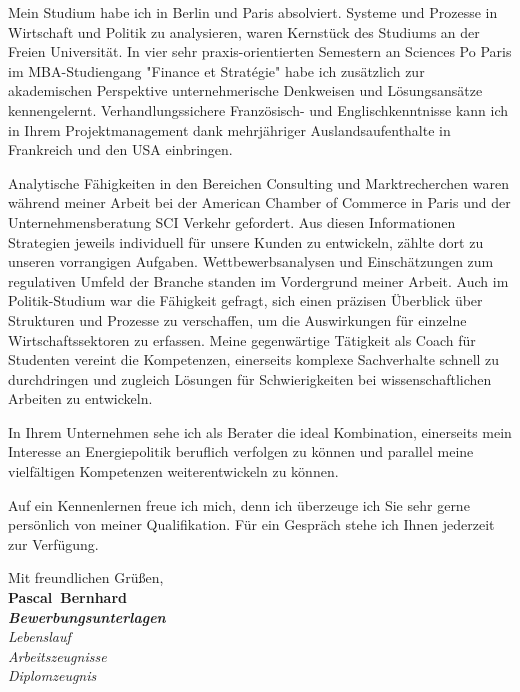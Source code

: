 \documentclass[11pt,a4paper]{article}
\def\firstname{Pascal}
\def\familyname{Bernhard}
\begin{document}
Mein Studium habe ich in Berlin und Paris absolviert. Systeme und Prozesse in Wirtschaft und Politik zu analysieren, waren Kernstück des Studiums an der Freien Universität. In vier sehr praxis-orientierten Semestern an Sciences Po Paris im MBA-Studiengang "Finance et Stratégie" habe ich zusätzlich zur akademischen Perspektive unternehmerische Denkweisen und Lösungsansätze kennengelernt. Verhandlungssichere Französisch- und Englischkenntnisse kann ich in Ihrem Projektmanagement dank mehrjähriger Auslandsaufenthalte in Frankreich und den USA einbringen.


Analytische Fähigkeiten in den Bereichen Consulting und Marktrecherchen waren während meiner Arbeit bei der American Chamber of Commerce in Paris und der Unternehmensberatung SCI Verkehr gefordert. Aus diesen Informationen Strategien jeweils individuell für unsere Kunden zu entwickeln, zählte dort zu unseren vorrangigen Aufgaben. Wettbewerbsanalysen und Einschätzungen zum regulativen Umfeld der Branche standen im Vordergrund meiner Arbeit. Auch im Politik-Studium war die Fähigkeit gefragt, sich einen präzisen Überblick über Strukturen und Prozesse zu verschaffen, um die Auswirkungen für einzelne Wirtschaftssektoren zu erfassen.
Meine gegenwärtige Tätigkeit als Coach für Studenten vereint die Kompetenzen, einerseits komplexe Sachverhalte schnell zu durchdringen und zugleich Lösungen für Schwierigkeiten bei wissenschaftlichen Arbeiten zu entwickeln.


In Ihrem Unternehmen sehe ich als Berater die ideal Kombination, einerseits mein Interesse an Energiepolitik beruflich verfolgen zu können und parallel meine vielfältigen Kompetenzen weiterentwickeln zu können.

\newpage

Auf ein Kennenlernen freue ich mich, denn ich überzeuge ich Sie sehr gerne persönlich von meiner Qualifikation. Für ein Gespräch stehe ich Ihnen jederzeit zur Verfügung.


  
Mit freundlichen Grüßen,\\[3em] %
%
{\bfseries \firstname~\familyname}\\
%
\vfill%
{\slshape \bfseries Bewerbungsunterlagen}\\
 {\slshape Lebenslauf\\
 Arbeitszeugnisse\\
 Diplomzeugnis{}}
\end{document}
